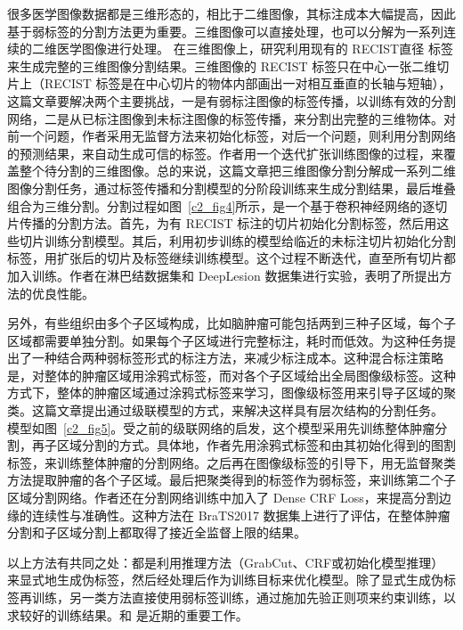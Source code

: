 很多医学图像数据都是三维形态的，相比于二维图像，其标注成本大幅提高，因此基于弱标签的分割方法更为重要。三维图像可以直接处理，也可以分解为一系列连续的二维医学图像进行处理。
在三维图像上，\citet{cai2018accurate}研究利用现有的 RECIST直径 标签来生成完整的三维图像分割结果。三维图像的 RECIST 标签只在中心一张二维切片上（RECIST 标签是在中心切片的物体内部画出一对相互垂直的长轴与短轴），这篇文章要解决两个主要挑战，一是有弱标注图像的标签传播，以训练有效的分割网络，二是从已标注图像到未标注图像的标签传播，来分割出完整的三维物体。对前一个问题，作者采用无监督方法来初始化标签，对后一个问题，则利用分割网络的预测结果，来自动生成可信的标签。作者用一个迭代扩张训练图像的过程，来覆盖整个待分割的三维图像。总的来说，这篇文章把三维图像分割分解成一系列二维图像分割任务，通过标签传播和分割模型的分阶段训练来生成分割结果，最后堆叠组合为三维分割。分割过程如图~\ref{c2_fig4}所示，是一个基于卷积神经网络的逐切片传播的分割方法。首先，为有 RECIST 标注的切片初始化分割标签，然后用这些切片训练分割模型。其后，利用初步训练的模型给临近的未标注切片初始化分割标签，用扩张后的切片及标签继续训练模型。这个过程不断迭代，直至所有切片都加入训练。作者在淋巴结数据集\citep{roth2014new}和 DeepLesion 数据集\citep{yan2018deep}进行实验，表明了所提出方法的优良性能。

另外，有些组织由多个子区域构成，比如脑肿瘤可能包括两到三种子区域，每个子区域都需要单独分割。如果每个子区域进行完整标注，耗时而低效。\citet{ji2019scribble}为这种任务提出了一种结合两种弱标签形式的标注方法，来减少标注成本。这种混合标注策略是，对整体的肿瘤区域用涂鸦式标签，而对各个子区域给出全局图像级标签。这种方式下，整体的肿瘤区域通过涂鸦式标签来学习，图像级标签用来引导子区域的聚类。这篇文章提出通过级联模型的方式，来解决这样具有层次结构的分割任务。
模型如图~\ref{c2_fig5}。受之前的级联网络的启发，这个模型采用先训练整体肿瘤分割，再子区域分割的方式。具体地，作者先用涂鸦式标签和由其初始化得到的图割标签，来训练整体肿瘤的分割网络。之后再在图像级标签的引导下，用无监督聚类方法提取肿瘤的各个子区域。最后把聚类得到的标签作为弱标签，来训练第二个子区域分割网络。作者还在分割网络训练中加入了 Dense CRF Loss，来提高分割边缘的连续性与准确性。这种方法在 BraTS2017 数据集\citep{menze2014multimodal}上进行了评估，在整体肿瘤分割和子区域分割上都取得了接近全监督上限的结果。

以上方法有共同之处：都是利用推理方法（GrabCut、CRF或初始化模型推理）来显式地生成伪标签，然后经处理后作为训练目标来优化模型。除了显式生成伪标签再训练，另一类方法直接使用弱标签训练，通过施加先验正则项来约束训练，以求较好的训练结果。\citet{kervadec2020bounding}和 \citet{tang2018regularized}是近期的重要工作。

